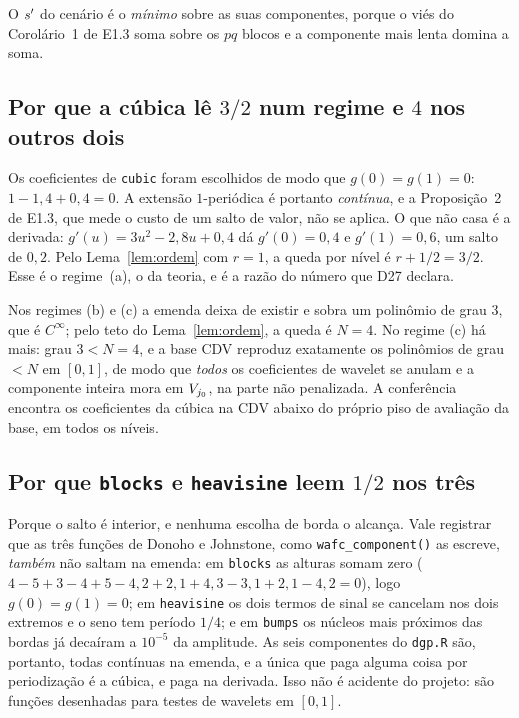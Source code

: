 \documentclass[11pt,a4paper]{article}
\begin{document}
O $s'$ do cenário é o \emph{mínimo} sobre as suas componentes, porque o
viés do Corolário~1 de E1.3 soma sobre os $pq$ blocos e a componente mais
lenta domina a soma.

\subsection*{Por que a cúbica lê $3/2$ num regime e $4$ nos outros dois}

Os coeficientes de \texttt{cubic} foram escolhidos de modo que
$g(0) = g(1) = 0$: $1 - 1{,}4 + 0{,}4 = 0$. A extensão $1$-periódica é
portanto \emph{contínua}, e a Proposição~2 de E1.3, que mede o custo de um
salto de valor, não se aplica. O que não casa é a derivada:
$g'(u) = 3u^{2} - 2{,}8u + 0{,}4$ dá $g'(0) = 0{,}4$ e $g'(1) = 0{,}6$, um
salto de $0{,}2$. Pelo Lema~\ref{lem:ordem} com $r = 1$, a queda por nível é
$r + 1/2 = 3/2$. Esse é o regime~(a), o da teoria, e é a razão do número que
D27 declara.

Nos regimes (b) e (c) a emenda deixa de existir e sobra um polinômio de grau
$3$, que é $C^{\infty}$; pelo teto do Lema~\ref{lem:ordem}, a queda é $N = 4$.
No regime (c) há mais: grau $3 < N = 4$, e a base CDV reproduz exatamente os
polinômios de grau $< N$ em $[0,1]$, de modo que \emph{todos} os coeficientes
de wavelet se anulam e a componente inteira mora em $V_{j_{0}}$, na parte não
penalizada. A conferência encontra os coeficientes da cúbica na CDV abaixo do
próprio piso de avaliação da base, em todos os níveis.

\subsection*{Por que \texttt{blocks} e \texttt{heavisine} leem $1/2$ nos três}

Porque o salto é interior, e nenhuma escolha de borda o alcança. Vale
registrar que as três funções de Donoho e Johnstone, como
\texttt{wafc\_component()} as escreve, \emph{também} não saltam na emenda: em
\texttt{blocks} as alturas somam zero
($4-5+3-4+5-4{,}2+2{,}1+4{,}3-3{,}1+2{,}1-4{,}2 = 0$), logo
$g(0) = g(1) = 0$; em \texttt{heavisine} os dois termos de sinal se cancelam
nos dois extremos e o seno tem período $1/4$; e em \texttt{bumps} os núcleos
mais próximos das bordas já decaíram a $10^{-5}$ da amplitude. As seis
componentes do \texttt{dgp.R} são, portanto, todas contínuas na emenda, e a
única que paga alguma coisa por periodização é a cúbica, e paga na derivada.
Isso não é acidente do projeto: são funções desenhadas para testes de wavelets
em $[0,1]$.
\end{document}
